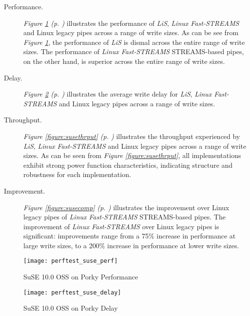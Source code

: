 \documentclass[letterpaper,final,notitlepage,twocolumn,10pt,twoside]{article}
\begin{document}
\begin{description}

\item[Performance.]

\textit{Figure \ref{figure:suseperf} (p. \pageref{figure:suseperf})}
illustrates the performance of \textsl{LiS}, \textsl{Linux Fast-STREAMS} and
Linux legacy pipes across a range of write sizes.  As can be see from
\textit{Figure \ref{figure:suseperf}}, the performance of \textsl{LiS} is
dismal across the entire range of write sizes.  The performance of
\textsl{Linux Fast-STREAMS} STREAMS-based pipes, on the other hand, is
superior across the entire range of write sizes.

\item[Delay.]

\textit{Figure \ref{figure:susedelay} (p. \pageref{figure:susedelay})}
illustrates the average write delay for \textsl{LiS}, \textsl{Linux
Fast-STREAMS} and Linux legacy pipes across a range of write sizes.

\item[Throughput.]

\textit{Figure \ref{figure:susethrput} (p. \pageref{figure:susethrput})}
illustrates the throughput experienced by \textsl{LiS}, \textsl{Linux
Fast-STREAMS} and Linux legacy pipes across a range of write sizes.  As can be
seen from \textit{Figure \ref{figure:susethrput}}, all implementations exhibit
strong power function characteristics, indicating structure and robustness for
each implementation.

\item[Improvement.]

\textit{Figure \ref{figure:susecomp} (p. \pageref{figure:susecomp})}
illustrates the improvement over Linux legacy pipes of \textsl{Linux
Fast-STREAMS} STREAMS-based pipes.  The improvement of \textsl{Linux
Fast-STREAMS} over Linux legacy pipes is significant: improvements range from
a 75\% increase in performance at large write sizes, to a 200\% increase in
performance at lower write sizes.

\end{description}

\begin{figure}[p]
\texttt{[image: perftest\_suse\_perf]}
\caption[SuSE 10.0 OSS on Porky Performance]{SuSE 10.0 OSS on Porky Performance}
\label{figure:suseperf}
\end{figure}

\begin{figure}[p]
\texttt{[image: perftest\_suse\_delay]}
\caption[SuSE 10.0 OSS on Porky Delay]{SuSE 10.0 OSS on Porky Delay}
\label{figure:susedelay}
\end{figure}
\end{document}
